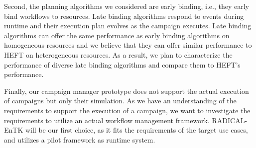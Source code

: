 Second, the planning algorithms we considered are early binding, i.e., they
early bind workflows to resources. Late binding algorithms respond to events
during runtime and their execution plan evolves as the campaign executes. Late
binding algorithms can offer the same performance as early binding algorithms on
homogeneous resources and we believe that they can offer similar performance to
HEFT on heterogeneous resources. As a result, we plan to characterize the
performance of diverse late binding algorithms and compare them to HEFT's
performance.

Finally, our campaign manager prototype does not support the actual execution of
campaigns but only their simulation. As we have an understanding of the
requirements to support the execution of a campaign, we want to investigate 
the requirements to utilize an actual workflow management framework.
RADICAL-EnTK will be our first choice, as it fits the requirements of the target
use cases, and utilizes a pilot framework as runtime system.
